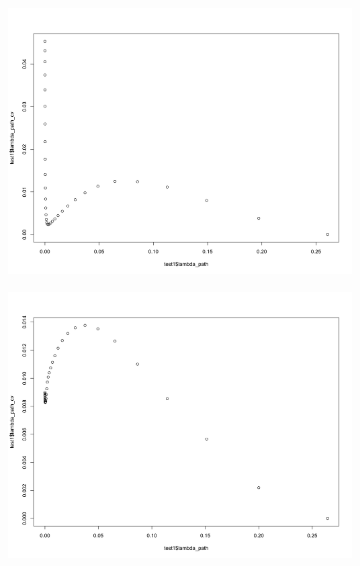\documentclass[letterpaper]{article}
\begin{document}
\begin{figure}[H]
\centering
\begin{subfigure}{0.5\textwidth}
  \centering
  \includegraphics[width=1\linewidth]{./result_plot/ll_use_k/1wrong_path_plot}
\end{subfigure}%
\begin{subfigure}{.5\textwidth}
  \centering
  \includegraphics[width=1\linewidth]{./result_plot/ll_use_k/2wrong_path_plot}
\end{subfigure}

\end{figure}
\end{document}
